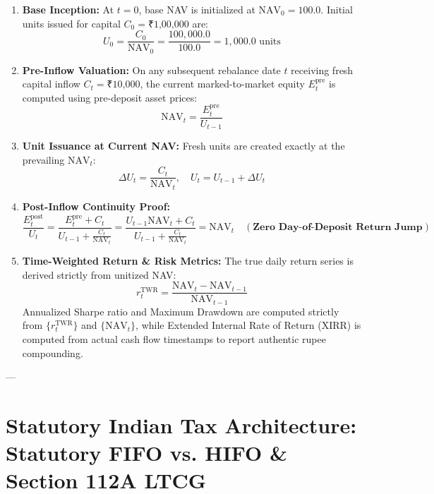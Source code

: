 \documentclass[11pt,a4paper]{article}
\begin{document}
\begin{enumerate}[leftmargin=*]
    \item \textbf{Base Inception:} At $t = 0$, base NAV is initialized at $\text{NAV}_0 = 100.0$. Initial units issued for capital $C_0 = \text{₹1,00,000}$ are:
    \begin{equation}
    U_0 = \frac{C_0}{\text{NAV}_0} = \frac{100,000.0}{100.0} = 1,000.0 \text{ units}
    \end{equation}
    \item \textbf{Pre-Inflow Valuation:} On any subsequent rebalance date $t$ receiving fresh capital inflow $C_t = \text{₹10,000}$, the current marked-to-market equity $E_t^{\text{pre}}$ is computed using pre-deposit asset prices:
    \begin{equation}
    \text{NAV}_t = \frac{E_t^{\text{pre}}}{U_{t-1}}
    \end{equation}
    \item \textbf{Unit Issuance at Current NAV:} Fresh units are created exactly at the prevailing $\text{NAV}_t$:
    \begin{equation}
    \Delta U_t = \frac{C_t}{\text{NAV}_t}, \quad U_t = U_{t-1} + \Delta U_t
    \end{equation}
    \item \textbf{Post-Inflow Continuity Proof:}
    \begin{equation}
    \frac{E_t^{\text{post}}}{U_t} = \frac{E_t^{\text{pre}} + C_t}{U_{t-1} + \frac{C_t}{\text{NAV}_t}} = \frac{U_{t-1}\text{NAV}_t + C_t}{U_{t-1} + \frac{C_t}{\text{NAV}_t}} = \text{NAV}_t \quad (\textbf{Zero Day-of-Deposit Return Jump})
    \end{equation}
    \item \textbf{Time-Weighted Return \& Risk Metrics:}
    The true daily return series is derived strictly from unitized NAV:
    \begin{equation}
    r_t^{\text{TWR}} = \frac{\text{NAV}_t - \text{NAV}_{t-1}}{\text{NAV}_{t-1}}
    \end{equation}
    Annualized Sharpe ratio and Maximum Drawdown are computed strictly from $\{r_t^{\text{TWR}}\}$ and $\{\text{NAV}_t\}$, while Extended Internal Rate of Return (XIRR) is computed from actual cash flow timestamps to report authentic rupee compounding.
\end{enumerate}

---

\section{Statutory Indian Tax Architecture: Statutory FIFO vs. HIFO \& Section 112A LTCG}
\end{document}
